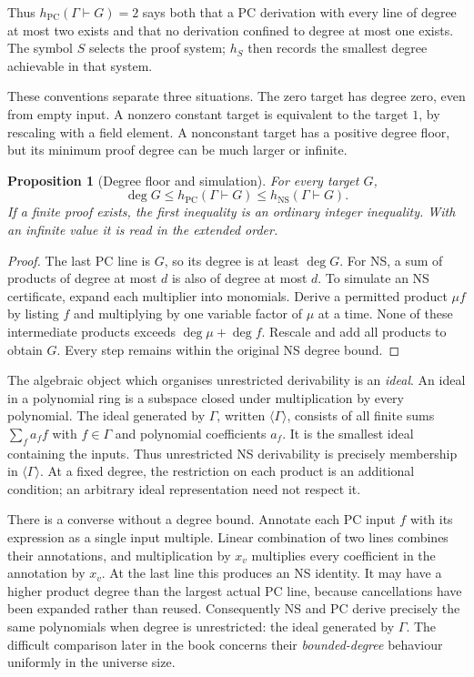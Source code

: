 \documentclass[11pt,a4paper,oneside,openany]{book}
\newtheorem{proposition}[theorem]{Proposition}
\theoremstyle{definition}\newtheorem{definition}[theorem]{Definition}
\theoremstyle{remark}\newtheorem{remark}[theorem]{Remark}
\newcommand{\NS}{\mathrm{NS}}\newcommand{\PC}{\mathrm{PC}}
\numberwithin{equation}{chapter}
\begin{document}
Thus $h_{\PC}(\Gamma\vdash G)=2$ says both that a PC derivation with
every line of degree at most two exists and that no derivation confined
to degree at most one exists. The symbol $S$ selects the proof system;
$h_S$ then records the smallest degree achievable in that system.

These conventions separate three situations. The zero target has degree
zero, even from empty input. A nonzero constant target is equivalent to
the target $1$, by rescaling with a field element. A nonconstant target
has a positive degree floor, but its minimum proof degree can be much
larger or infinite.

\begin{proposition}[Degree floor and simulation]\label{tx:prop:basic-comparison}
For every target $G$,
\begin{equation}\label{tx:eq:basic-comparison}
 \deg G\le h_{\PC}(\Gamma\vdash G)
          \le h_{\NS}(\Gamma\vdash G).
\end{equation}
If a finite proof exists, the first inequality is an ordinary integer
inequality. With an infinite value it is read in the extended order.
\end{proposition}
\begin{proof}
The last PC line is $G$, so its degree is at least $\deg G$. For NS,
a sum of products of degree at most $d$ is also of degree at most $d$.
To simulate an NS certificate, expand each multiplier into monomials.
Derive a permitted product $\mu f$ by listing $f$ and multiplying by
one variable factor of $\mu$ at a time. None of these intermediate
products exceeds $\deg\mu+\deg f$. Rescale and add all products to
obtain $G$. Every step remains within the original NS degree bound.
\end{proof}

The algebraic object which organises unrestricted derivability is an
\emph{ideal}. An ideal in a polynomial ring is a subspace closed under
multiplication by every polynomial. The ideal generated by $\Gamma$,
written $\langle\Gamma\rangle$, consists of all finite sums
$\sum_f a_ff$ with $f\in\Gamma$ and polynomial coefficients $a_f$.
It is the smallest ideal containing the inputs. Thus unrestricted NS
derivability is precisely membership in $\langle\Gamma\rangle$.
At a fixed degree, the restriction on each product is an additional
condition; an arbitrary ideal representation need not respect it.

There is a converse without a degree bound. Annotate each PC input $f$
with its expression as a single input multiple. Linear combination of
two lines combines their annotations, and multiplication by $x_v$
multiplies every coefficient in the annotation by $x_v$. At the last
line this produces an NS identity. It may have a higher product degree
than the largest actual PC line, because cancellations have been
expanded rather than reused. Consequently NS and PC derive precisely
the same polynomials when degree is unrestricted: the ideal generated
by $\Gamma$. The difficult comparison later in the book concerns their
\emph{bounded-degree} behaviour uniformly in the universe size.
\end{document}
